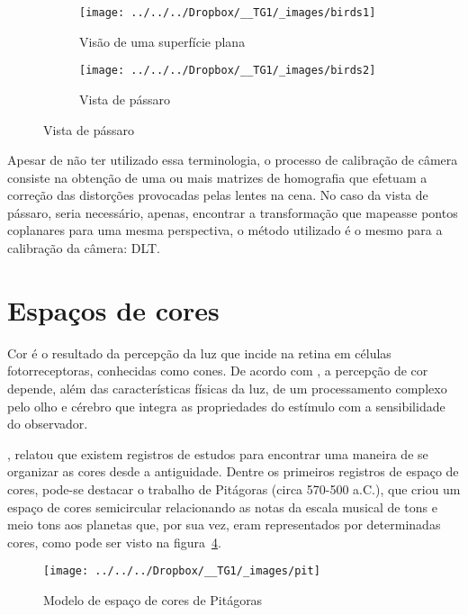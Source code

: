 \documentclass[ecp,tc]{iiufrgs}
\begin{document}
\begin{figure}
	\centering
	\caption{Vista de pássaro (\textit{bird's eye view})}
	\begin{subfigure}[b]{0.47\textwidth}
		\texttt{[image: ../../../Dropbox/\_\_TG1/\_images/birds1]}
		\caption{Visão de uma superfície plana}
		\label{fig:birds1}
	\end{subfigure}
	\quad
	\begin{subfigure}[b]{0.4\textwidth}
		\texttt{[image: ../../../Dropbox/\_\_TG1/\_images/birds2]}
		\caption{Vista de pássaro}
		\label{fig:birds2}
	\end{subfigure}
	\label{fig:image7}
\end{figure}


Apesar de não ter utilizado essa terminologia, o processo de calibração de câmera consiste na obtenção de uma ou mais matrizes de homografia que efetuam a correção das distorções provocadas pelas lentes na cena. No caso da vista de pássaro, seria necessário, apenas, encontrar a transformação que mapeasse pontos coplanares para uma mesma perspectiva, o método utilizado é o mesmo para a calibração da câmera: DLT.


\section{Espaços de cores}

Cor é o resultado da percepção da luz que incide na retina em células fotorreceptoras, conhecidas como cones. De acordo com , a percepção de cor depende, além das características físicas da luz, de um processamento complexo pelo olho e cérebro que integra as propriedades do estímulo com a sensibilidade do observador.

, relatou que existem registros de estudos para encontrar uma maneira de se organizar as cores desde a antiguidade. Dentre os primeiros registros de espaço de cores, pode-se destacar  o trabalho de Pitágoras (circa 570-500 a.C.), que criou um espaço de cores semicircular relacionando as notas da escala musical de tons e meio tons aos planetas que, por sua vez, eram representados por determinadas cores, como pode ser visto na figura~\ref{fig:pit}.

\begin{figure}
	\centering
	\caption{Modelo de espaço de cores de Pitágoras}
	\texttt{[image: ../../../Dropbox/\_\_TG1/\_images/pit]}
	\label{fig:pit}
\end{figure}
\end{document}
